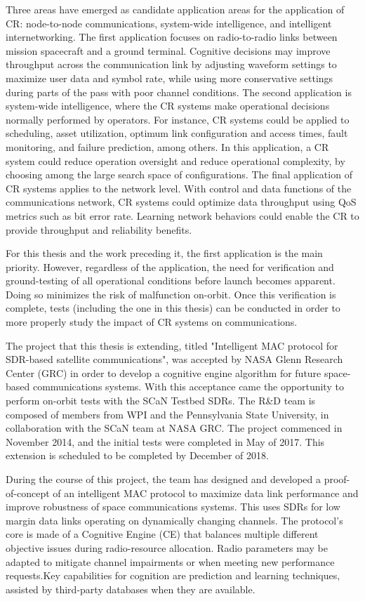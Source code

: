 	\par Three areas have emerged as candidate application areas for the application of CR: node-to-node communications, system-wide intelligence, and intelligent internetworking. The first application focuses on radio-to-radio links between mission spacecraft and a ground terminal. Cognitive decisions may improve throughput across the communication link by adjusting waveform settings to maximize user data and symbol rate, while using more conservative settings during parts of the pass with poor channel conditions. The second application is system-wide intelligence, where the CR systems make operational decisions normally performed by operators. For instance, CR systems could be applied to scheduling, asset utilization, optimum link configuration and access times, fault monitoring, and failure prediction, among others. In this application, a CR system could reduce operation oversight and reduce operational complexity, by choosing among the large search space of configurations. The final application of CR systems applies to the network level. With control and data functions of the communications network, CR systems could optimize data throughput using QoS metrics such as bit error rate. Learning network behaviors could enable the CR to provide throughput and reliability benefits.
	\par  For this thesis and the work preceding it, the first application is the main priority. However, regardless of the application, the need for verification and ground-testing of all operational conditions before launch becomes apparent. Doing so minimizes the risk of malfunction on-orbit. Once this verification is complete, tests (including the one in this thesis) can be conducted in order to more properly study the impact of CR systems on communications.
	\par The project that this thesis is extending, titled "Intelligent MAC protocol for SDR-based satellite communications", was accepted by NASA Glenn Research Center (GRC) in order to develop a cognitive engine algorithm for future space-based communications systems. With this acceptance came the opportunity to perform on-orbit tests with the SCaN Testbed SDRs. The R\&D team is composed of members from WPI and the Pennsylvania State University, in collaboration with the SCaN team at NASA GRC. The project commenced in November 2014, and the initial tests were completed in May of 2017. This extension is scheduled to be completed by December of 2018.
	\par During the course of this project, the team has designed and developed a proof-of-concept of an intelligent MAC protocol to maximize data link performance and improve robustness of space communications systems. This uses SDRs for low margin data links operating on dynamically changing channels. The protocol's core is made of a Cognitive Engine (CE) that balances multiple different objective issues during radio-resource allocation. Radio parameters may be adapted to mitigate channel impairments or when meeting new performance requests.Key capabilities for cognition are prediction and learning techniques, assisted by third-party databases when they are available.  
